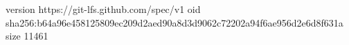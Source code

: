 version https://git-lfs.github.com/spec/v1
oid sha256:b64a96e458125809ec209d2aed90a8d3d9062c72202a94f6ae956d2e6d8f631a
size 11461
